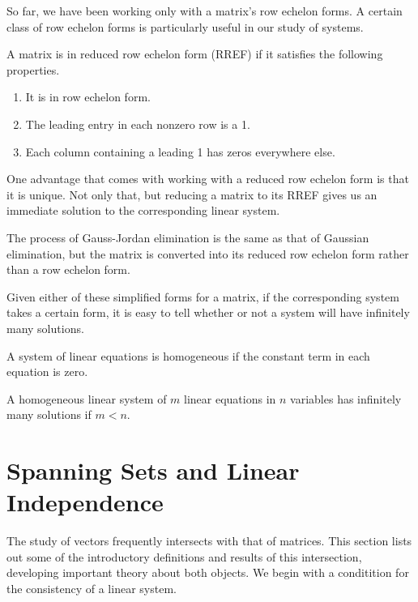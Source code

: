\documentclass[../m073main.tex]{subfiles}
\begin{document}
So far, we have been working only with a matrix's row echelon forms.
A certain class of row echelon forms is particularly useful in our study of systems.

\begin{definition}
	A matrix is in reduced row echelon form (RREF) if it satisfies the following properties.
	\begin{enumerate}
		\item It is in row echelon form.
		\item The leading entry in each nonzero row is a 1.
		\item Each column containing a leading 1 has zeros everywhere else.
	\end{enumerate}
\end{definition}

One advantage that comes with working with a reduced row echelon form is that it is unique.
Not only that, but reducing a matrix to its RREF gives us an immediate solution to the corresponding linear system.

\begin{definition}
	The process of Gauss-Jordan elimination is the same as that of Gaussian elimination, but the matrix is converted into its reduced row echelon form rather than a row echelon form.
\end{definition}

Given either of these simplified forms for a matrix, if the corresponding system takes a certain form, it is easy to tell whether or not a system will have infinitely many solutions.

\begin{definition}
	A system of linear equations is homogeneous if the constant term in each equation is zero.
\end{definition}

\begin{theorem}
	A homogeneous linear system of $m$ linear equations in $n$ variables has infinitely many solutions if $m < n$.
\end{theorem}

\section{Spanning Sets and Linear Independence}
The study of vectors frequently intersects with that of matrices.
This section lists out some of the introductory definitions and results of this intersection, developing important theory about both objects.
We begin with a conditition for the consistency of a linear system.
\end{document}
